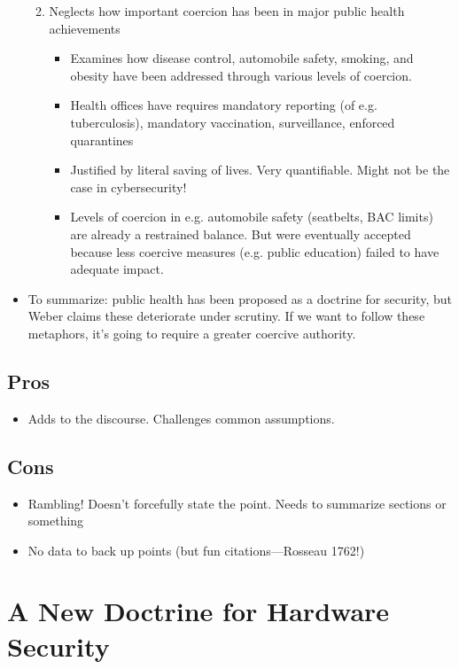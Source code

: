 \documentclass[11pt]{article}
\begin{document}
\begin{itemize}
\begin{enumerate}
\begin{itemize}
        \end{itemize}
        \item Neglects how important coercion has been in major public health achievements
        \begin{itemize}
            \item Examines how disease control, automobile safety, smoking, and obesity have been addressed through various levels of coercion.
            \item Health offices have requires mandatory reporting (of e.g. tuberculosis), mandatory vaccination, surveillance, enforced quarantines
            \item Justified by literal saving of lives. Very quantifiable. Might not be the case in cybersecurity!
            \item Levels of coercion in e.g. automobile safety (seatbelts, BAC limits) are already a restrained balance. But were eventually accepted because less coercive measures (e.g. public education) failed to have adequate impact. 
        \end{itemize}
    \end{enumerate}
    \item To summarize: public health has been proposed as a doctrine for security, but Weber claims these deteriorate under scrutiny. If we want to follow these metaphors, it's going to require a greater coercive authority.
\end{itemize}

\subsection{Pros}
\begin{itemize}
    \item Adds to the discourse. Challenges common assumptions.
\end{itemize}

\subsection{Cons}
\begin{itemize}
    \item Rambling! Doesn't forcefully state the point. Needs to summarize sections or something
    \item No data to back up points (but fun citations---Rosseau 1762!)
\end{itemize}

\section*{A New Doctrine for Hardware Security}
\end{document}
